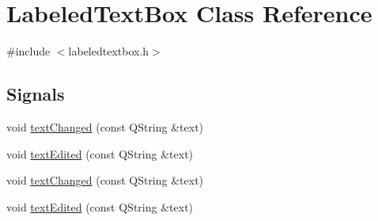 \hypertarget{class_labeled_text_box}{
\section{LabeledTextBox Class Reference}
\label{class_labeled_text_box}
}


{\ttfamily \#include $<$labeledtextbox.h$>$}

\subsection*{Signals}
\begin{DoxyCompactItemize}
\item 
void \hyperlink{class_labeled_text_box_a45ed027f27061df9d76c1d71fe47d026}{textChanged} (const QString \&text)
\item 
void \hyperlink{class_labeled_text_box_a80fee1c49a7464f0994ad778f3ea589b}{textEdited} (const QString \&text)
\item 
void \hyperlink{class_labeled_text_box_a45ed027f27061df9d76c1d71fe47d026}{textChanged} (const QString \&text)
\item 
void \hyperlink{class_labeled_text_box_a80fee1c49a7464f0994ad778f3ea589b}{textEdited} (const QString \&text)
\end{DoxyCompactItemize}
